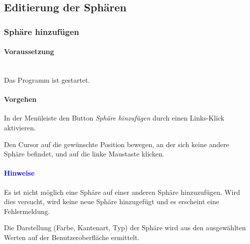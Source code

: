 \documentclass[enabledeprecatedfontcommands,fontsize=11pt,paper=a4,twoside]{scrartcl}
\newcounter{one}
\newcounter{two}[one]
\newcommand*{\hint}{\paragraph{\textcolor{blue}{Hinweise}}}
\newcommand*{\condition}{\paragraph{Voraussetzung}$\;$ \vspace{0.2cm}\\}
\newcommand*{\action}{\paragraph{Vorgehen}}
\let\tempone\itemize
\let\temptwo\enditemize
\renewenvironment{itemize}{\tempone\addtolength{\itemsep}{-10.0pt}}{\temptwo}
\let\origenumerate\enumerate
\let\origendenumerate\endenumerate
\renewenvironment{enumerate}{\origenumerate \addtolength{\itemsep}{-10.0pt}}{\origendenumerate}
\begin{document}
		
\subsection{Editierung der Sphären} \label{sphere}	
\subsubsection{Sphäre hinzufügen}	
		\condition 	
		Das Programm ist gestartet.
		\action
		\begin{enumerate}
			\item In der Menüleiste den Button \textit{Sphäre hinzufügen} durch einen Links-Klick aktivieren.
			\item Den Cursor auf die gewünschte Position bewegen, an der sich keine andere Sphäre befindet, und auf die linke Maustaste klicken.
		\end{enumerate}
		\hint
		\begin{itemize}
			\item Es ist nicht möglich eine Sphäre auf einer anderen Sphäre hinzuzufügen. Wird dies versucht, wird keine neue Sphäre hinzugefügt und es erscheint eine Fehlermeldung.
			\item Die Darstellung (Farbe, Kantenart, Typ) der Sphäre wird aus den ausgewählten Werten auf der Benutzeroberfläche ermittelt. \\
	\end{itemize}
	
	
\end{document}
